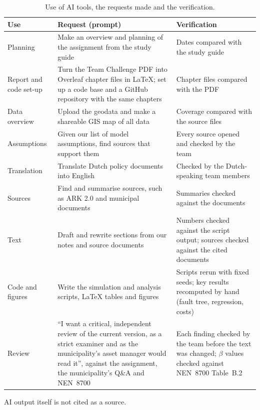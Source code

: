 \begin{table}[htbp]
\centering
\small
\caption{Use of AI tools, the requests made and the verification.}
\label{tab:ai-use}
\begin{tabularx}{\textwidth}{@{}>{\raggedright\arraybackslash}p{3.6cm}
  >{\raggedright\arraybackslash}X >{\raggedright\arraybackslash}p{5.0cm}@{}}
\toprule
Use & Request (prompt) & Verification \\
\midrule
Planning & Make an overview and planning of the assignment from the study guide & Dates compared with the study guide \\
Report and code set-up & Turn the Team Challenge PDF into Overleaf chapter files in LaTeX; set up a code base and a GitHub repository with the same chapters & Chapter files compared with the PDF \\
Data overview & Upload the geodata and make a shareable GIS map of all data & Coverage compared with the source files \\
Assumptions & Given our list of model assumptions, find sources that support them & Every source opened and checked by the team \\
Translation & Translate Dutch policy documents into English & Checked by the Dutch-speaking team members \\
Sources & Find and summarise sources, such as ARK 2.0 and municipal documents & Summaries checked against the documents \\
Text & Draft and rewrite sections from our notes and source documents & Numbers checked against the script output; sources checked against the cited documents \\
Code and figures & Write the simulation and analysis scripts, LaTeX tables and figures & Scripts rerun with fixed seeds; key results recomputed by hand (fault tree, regression, costs) \\
Review & ``I want a critical, independent review of the current version, as a strict examiner and as the municipality's asset manager would read it'', against the assignment, the municipality's Q\&A and NEN~8700 & Each finding checked by the team before the text was changed; $\beta$ values checked against NEN~8700 Table~B.2 \\
\bottomrule
\end{tabularx}
\end{table}

AI output itself is not cited as a source.
